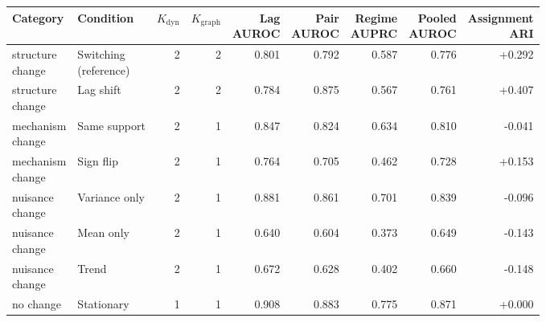\begin{tabular}{llrrrrrrr}
\toprule
Category & Condition & $K_{\mathrm{dyn}}$ & $K_{\mathrm{graph}}$ & \shortstack{Lag\\AUROC} & \shortstack{Pair\\AUROC} & \shortstack{Regime\\AUPRC} & \shortstack{Pooled\\AUROC} & \shortstack{Assignment\\ARI} \\
\midrule
\shortstack[l]{structure\\change} & \shortstack[l]{Switching\\(reference)} & 2 & 2 & 0.801 & 0.792 & 0.587 & 0.776 & +0.292 \\
\shortstack[l]{structure\\change} & Lag shift & 2 & 2 & 0.784 & 0.875 & 0.567 & 0.761 & +0.407 \\
\midrule
\shortstack[l]{mechanism\\change} & Same support & 2 & 1 & 0.847 & 0.824 & 0.634 & 0.810 & -0.041 \\
\shortstack[l]{mechanism\\change} & Sign flip & 2 & 1 & 0.764 & 0.705 & 0.462 & 0.728 & +0.153 \\
\midrule
\shortstack[l]{nuisance\\change} & Variance only & 2 & 1 & 0.881 & 0.861 & 0.701 & 0.839 & -0.096 \\
\shortstack[l]{nuisance\\change} & Mean only & 2 & 1 & 0.640 & 0.604 & 0.373 & 0.649 & -0.143 \\
\shortstack[l]{nuisance\\change} & Trend & 2 & 1 & 0.672 & 0.628 & 0.402 & 0.660 & -0.148 \\
\midrule
no change & Stationary & 1 & 1 & 0.908 & 0.883 & 0.775 & 0.871 & +0.000 \\
\bottomrule
\end{tabular}
